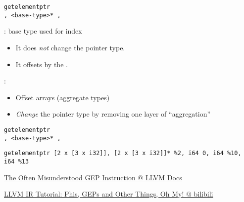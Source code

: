 \begin{frame}{}
  \begin{center}
    \texttt{getelementptr \\[5pt] , <base-type>* , \teal{[i32/i64 <index>]+}}
  \end{center}

  \pause
  \vspace{0.80cm}
  : base type used for  index
  \begin{itemize}
    \setlength{\itemsep}{5pt}
    \item It does \emph{not} change the pointer type.
    \item It offsets by the .
  \end{itemize}

  \pause
  \vspace{0.80cm}
  :
  \begin{itemize}
    \setlength{\itemsep}{5pt}
    \item Offset  arrays (aggregate types)
    \item \emph{Change} the pointer type by removing one layer of ``aggregation''
  \end{itemize}
\end{frame}

\begin{frame}{}
  \begin{center}
    \texttt{getelementptr \\[5pt] , <base-type>* , \teal{[i32/i64 <index>]+}}

    \vspace{0.80cm}
    \vspace{0.60cm}

    \texttt{getelementptr [2 x [3 x i32]], [2 x [3 x i32]]* \%2, i64 0, i64 \%10, i64 \%13}
  \end{center}
\end{frame}

\begin{frame}{}
  \begin{center}
    \href{https://llvm.org/docs/GetElementPtr.html}{The Often Misunderstood GEP Instruction @ LLVM Docs}
  \end{center}

  \pause
  \vspace{0.30cm}
  \begin{center}

    \vspace{0.30cm}
    \href{https://www.bilibili.com/video/BV1oE411y711/?share_source=copy_web&vd_source=afddc1f6e07c3046ed07519aa34370fd}{LLVM IR Tutorial: Phis, GEPs and Other Things, Oh My! @ bilibili}
  \end{center}
\end{frame}
